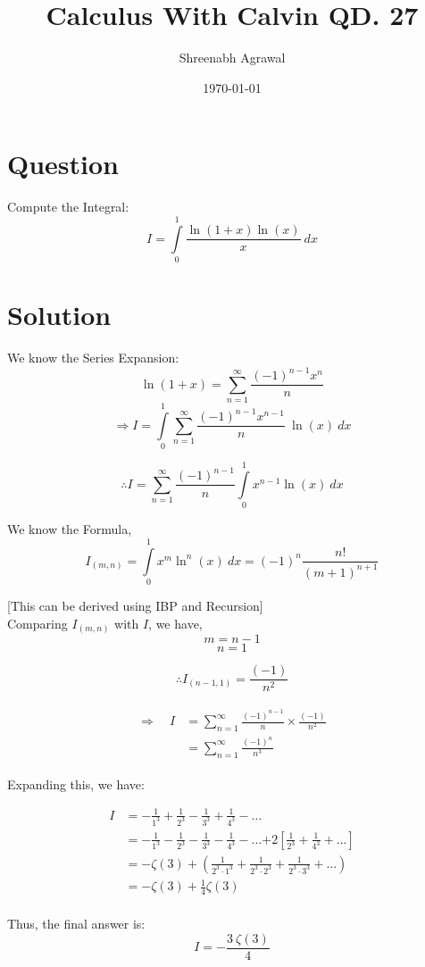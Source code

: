 \documentclass{article}
\title{Calculus With Calvin QD. 27}
\author{Shreenabh Agrawal}
\date{\today}
\begin{document}
\maketitle

\section{Question}
Compute the Integral:
$$I=\int\limits_{0}^{1} \frac{\ln (1+x) \ln (x)}{x} \: d x$$

\section{Solution}
We know the Series Expansion:
$$\ln (1+x)=\sum_{n=1}^{\infty} \frac{(-1)^{n-1} x^{n}}{n}$$
$$\Rightarrow I=\int\limits_{0}^{1} \sum_{n=1}^{\infty} \frac{(-1)^{n-1} x^{n-1}}{n} \: \ln (x) \: d x$$

$$\therefore I=\sum_{n=1}^{\infty} \frac{(-1)^{n-1}}{n} \int\limits_{0}^{1} x^{n-1} \ln (x) \: d x$$

We know the Formula,
$$I_{(m, n)}=\int\limits_{0}^{1} x^{m} \ln ^{n}(x) \: d x=(-1)^{n} \frac{n !}{(m+1)^{n+1}}$$

[This can be derived using IBP and Recursion] \\

Comparing $I_{(m, n)}$ with $I$, we have,
$$m = n-1$$
$$n = 1$$

$$\therefore I_{(n-1,1)}=\frac{(-1)}{n^{2}}$$

$$\begin{array}{l}
\begin{aligned}
\Rightarrow \quad I &=\sum_{n=1}^{\infty} \frac{(-1)^{n-1}}{n} \times \frac{(-1)}{n^{2}} \\
&=\sum_{n=1}^{\infty} \frac{(-1)^{n}}{n^{3}}
\end{aligned}
\end{array}$$

Expanding this, we have:

$$\begin{aligned}
I&=-\frac{1}{1^{3}}+\frac{1}{2^{3}}-\frac{1}{3^{3}}+\frac{1}{4^{3}}-\ldots \\
&=-\frac{1}{1^{3}}-\frac{1}{2^{3}}-\frac{1}{3^{3}}-\frac{1}{4^{3}}-\ldots 
{+2\left[\frac{1}{2^{3}}+\frac{1}{4^{3}}+\ldots\right]}\\
&=-\zeta(3)+\left(\frac{1}{2^{3} \cdot 1^{3}}+\frac{1}{2^{3} \cdot 2^{3}}+\frac{1}{2^{3} \cdot 3^{3}}+\ldots\right) \\
&=-\zeta(3)+\frac{1}{4} \zeta(3) \\
\end{aligned}$$

Thus, the final answer is:
$$\boxed{I=-\frac{3 \: \zeta(3)}{4}}$$
\end{document}
